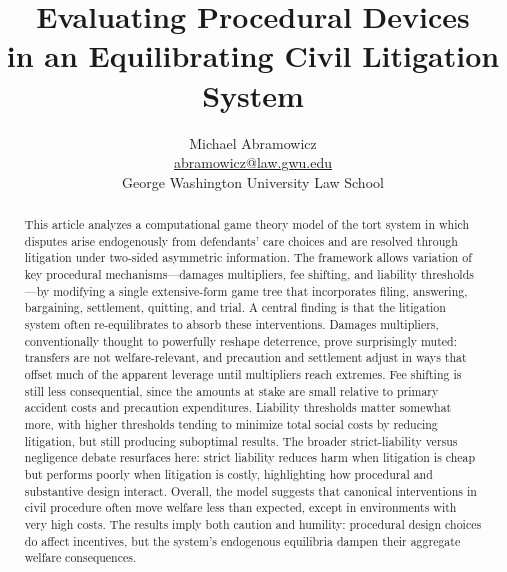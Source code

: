 \documentclass{article}
\newenvironment{nohyphen}
  {\hyphenpenalty=10000 \exhyphenpenalty=10000 \sloppy}
  {\par}
\begin{document}
\title{Evaluating Procedural Devices \\ in an Equilibrating Civil Litigation System}
\author{Michael Abramowicz \\ \href{mailto:abramowicz@law.gwu.edu}{abramowicz@law.gwu.edu} \\ George Washington University Law School}

\maketitle

\begin{abstract}
\begin{nohyphen}
This article analyzes a computational game theory model of the tort system in which disputes arise endogenously from defendants’ care choices and are resolved through litigation under two-sided asymmetric information. The framework allows variation of key procedural mechanisms—damages multipliers, fee shifting, and liability thresholds—by modifying a single extensive-form game tree that incorporates filing, answering, bargaining, settlement, quitting, and trial. A central finding is that the litigation system often re-equilibrates to absorb these interventions. Damages multipliers, conventionally thought to powerfully reshape deterrence, prove surprisingly muted: transfers are not welfare-relevant, and precaution and settlement adjust in ways that offset much of the apparent leverage until multipliers reach extremes. Fee shifting is still less consequential, since the amounts at stake are small relative to primary accident costs and precaution expenditures. Liability thresholds matter somewhat more, with higher thresholds tending to minimize total social costs by reducing litigation, but still producing suboptimal results. The broader strict-liability versus negligence debate resurfaces here: strict liability reduces harm when litigation is cheap but performs poorly when litigation is costly, highlighting how procedural and substantive design interact. Overall, the model suggests that canonical interventions in civil procedure often move welfare less than expected, except in environments with very high costs. The results imply both caution and humility: procedural design choices do affect incentives, but the system’s endogenous equilibria dampen their aggregate welfare consequences.
\end{nohyphen}
\end{abstract}
\end{document}
